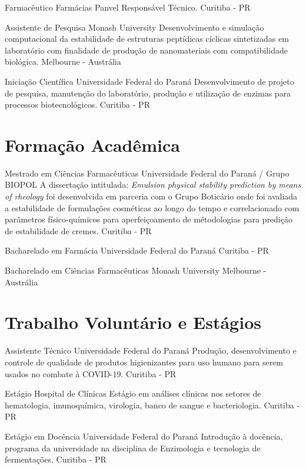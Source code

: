 {Farmacêutico}
{Farmácias Panvel}
{Responsável Técnico.}
{Curitiba - PR}

{Assistente de Pesquisa}
{Monash University}
{
	Desenvolvimento e simulação computacional da estabilidade 
	de estruturas peptídicas cíclicas sintetizadas em laboratório 
	com finalidade de produção de nanomateriais com compatibilidade biológica.
}
{Melbourne - Austrália}

{Iniciação Científica}
{Universidade Federal do Paraná}
{
	Desenvolvimento de projeto de pesquisa, 
	manutenção do laboratório, 
	produção e utilização de enzimas para processos biotecnológicos.
}
{Curitiba - PR}

\section{Formação Acadêmica}

{Mestrado em Ciências Farmacêuticas}
{Universidade Federal do Paraná / Grupo BIOPOL}
{
	A dissertação intitulada: \emph{Emulsion physical stability prediction by means of rheology}
	foi desenvolvida em parceria com o Grupo Boticário onde foi avaliada a estabilidade
	de formulações cosméticas ao longo do tempo e correlacionado com parâmetros 
	físico-químicos para aperfeiçoamento de métodologias para predição de estabilidade de cremes.
}
{Curitiba - PR}

{Bacharelado em Farmácia}
{Universidade Federal do Paraná}
{}
{Curitiba - PR}

{Bacharelado em Ciências Farmacêuticas}
{Monash University}
{}
{Melbourne - Austrália}

\section{Trabalho Voluntário e Estágios}

{Assistente Técnico}
{Universidade Federal do Paraná}
{
	Produção, desenvolvimento e controle de qualidade de produtos higienizantes 
	para uso humano para serem usados no combate à COVID-19.
}
{Curitiba - PR}

{Estágio}
{Hospital de Clínicas}
{
	Estágio em análises clínicas nos setores de hematologia, 
	imunoquímica, virologia, banco de sangue e bacteriologia.
}
{Curitiba - PR}

{Estágio em Docência}
{Universidade Federal do Paraná}
{
	Introdução à docência, programa da universidade 
	na disciplina de Enzimologia e tecnologia de fermentações.
}
{Curitiba - PR}

